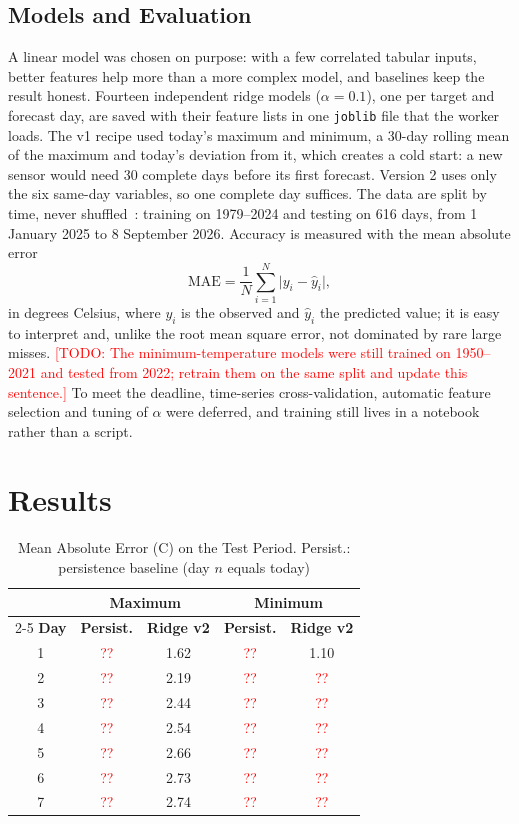 \documentclass[conference]{IEEEtran}
\newcommand{\todo}[1]{\textcolor{red}{[TODO: #1]}}
\newcommand{\tbd}{\textcolor{red}{??}}
\begin{document}
\subsection{Models and Evaluation}
\label{sec:models}
A linear model was chosen on purpose: with a few correlated tabular inputs, better features help more than a more complex model, and baselines keep the result honest. Fourteen independent ridge models ($\alpha = 0.1$), one per target and forecast day, are saved with their feature lists in one \texttt{joblib} file that the worker loads. The v1 recipe used today's maximum and minimum, a 30-day rolling mean of the maximum and today's deviation from it, which creates a cold start: a new sensor would need 30 complete days before its first forecast. Version 2 uses only the six same-day variables, so one complete day suffices. The data are split by time, never shuffled~\cite{b5}: training on 1979--2024 and testing on 616 days, from 1 January 2025 to 8 September 2026. Accuracy is measured with the mean absolute error
\begin{equation}
\mathrm{MAE} = \frac{1}{N}\sum_{i=1}^{N} \lvert y_i - \hat{y}_i \rvert ,
\end{equation}
in degrees Celsius, where $y_i$ is the observed and $\hat{y}_i$ the predicted value; it is easy to interpret and, unlike the root mean square error, not dominated by rare large misses. \todo{The minimum-temperature models were still trained on 1950--2021 and tested from 2022; retrain them on the same split and update this sentence.} To meet the deadline, time-series cross-validation, automatic feature selection and tuning of $\alpha$ were deferred, and training still lives in a notebook rather than a script.

\section{Results}
\label{sec:results}

\begin{table}[t]
\caption{Mean Absolute Error (\textdegree C) on the Test Period. Persist.: persistence baseline (day $n$ equals today)}
\label{tab:mae}
\centering
\begin{tabular}{|c|c|c|c|c|}
\hline
 & \multicolumn{2}{c|}{\textbf{Maximum}} & \multicolumn{2}{c|}{\textbf{Minimum}} \\
\cline{2-5}
\textbf{Day} & \textbf{Persist.} & \textbf{Ridge v2} & \textbf{Persist.} & \textbf{Ridge v2} \\
\hline
1 & \tbd & 1.62 & \tbd & 1.10 \\
2 & \tbd & 2.19 & \tbd & \tbd \\
3 & \tbd & 2.44 & \tbd & \tbd \\
4 & \tbd & 2.54 & \tbd & \tbd \\
5 & \tbd & 2.66 & \tbd & \tbd \\
6 & \tbd & 2.73 & \tbd & \tbd \\
7 & \tbd & 2.74 & \tbd & \tbd \\
\hline
\end{tabular}
\end{table}
\end{document}
